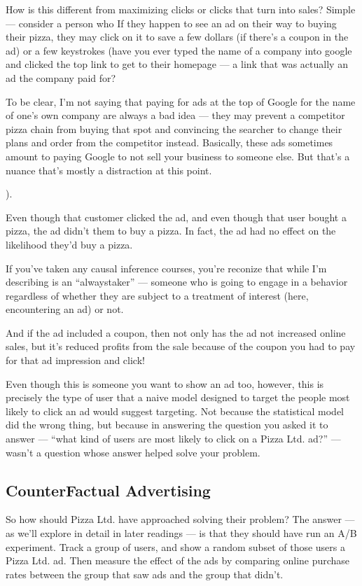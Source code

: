 \documentclass[letterpaper,10pt,english]{jupyterBook}
\begin{document}
\sphinxAtStartPar
How is this different from maximizing clicks or clicks that turn into sales? Simple — consider a person who  If they happen to see an ad on their way to buying their pizza, they may click on it to save a few dollars (if there’s a coupon in the ad) or a few keystrokes (have you ever typed the name of a company into google and clicked the top link to get to their homepage — a link that was actually an ad the company paid for?%
\begin{footnote}[1]\sphinxAtStartFootnote
To be clear, I’m not saying that paying for ads at the top of Google for the name of one’s own company are always a bad idea — they may prevent a competitor pizza chain from buying that spot and convincing the searcher to change their plans and order from the competitor instead. Basically, these ads sometimes amount to paying Google to not sell your business to someone else. But that’s a nuance that’s mostly a distraction at this point.
%
\end{footnote}).

\sphinxAtStartPar
Even though that customer clicked the ad, and even though that user bought a pizza, the ad didn’t  them to buy a pizza. In fact, the ad had no effect on the likelihood they’d buy a pizza.%
\begin{footnote}[2]\sphinxAtStartFootnote
If you’ve taken any causal inference courses, you’re reconize that while I’m describing is an “always\sphinxhyphen{}taker” — someone who is going to engage in a behavior regardless of whether they are subject to a treatment of interest (here, encountering an ad) or not.
%
\end{footnote} And if the ad included a coupon, then not only has the ad not increased online sales, but it’s reduced profits from the sale because of the coupon  you had to pay for that ad impression and click!

\sphinxAtStartPar
Even though this is  someone you want to show an ad too, however, this is precisely the type of user that a naive model designed to target the people most likely to click an ad would suggest targeting. Not because the statistical model did the wrong thing, but because in answering the question you asked it to answer — “what kind of users are most likely to click on a Pizza Ltd. ad?” — wasn’t a question whose answer helped solve your problem.


\subsection{Counter\sphinxhyphen{}Factual Advertising}
\label{\detokenize{20_problems_to_questions/15_solving_the_wrong_problem:counter-factual-advertising}}
\sphinxAtStartPar
So how should Pizza Ltd. have approached solving their problem? The answer — as we’ll explore in detail in later readings — is that they should have run an A/B experiment. Track a group of users, and show a random subset of those users a Pizza Ltd. ad. Then measure the effect of the ads by comparing online purchase rates between the group that saw ads and the group that didn’t.
\end{document}
